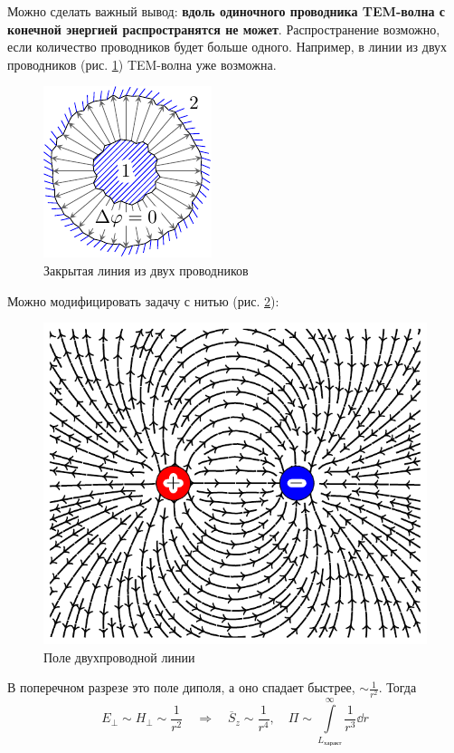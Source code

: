 Можно сделать важный вывод: \textbf{вдоль одиночного проводника TEM-волна с конечной энергией распространятся не может}. Распространение возможно, если количество проводников будет больше одного. Например, в линии из двух проводников (рис. \ref{fig:lect4:4}) TEM-волна уже возможна.

\begin{figure}[h!]
	\centering
	\includegraphics[scale=1.5]{img/lect4_ris4}
	\caption{Закрытая линия из двух проводников}
	\label{fig:lect4:4}
\end{figure}

Можно модифицировать задачу с нитью (рис. \ref{fig:lect4:5}):

\begin{figure}[h!]
	\centering
	\includegraphics[scale=0.7]{img/lect4_ris5}
	\caption{Поле двухпроводной линии}
	\label{fig:lect4:5}
\end{figure}

В поперечном разрезе это поле диполя, а оно спадает быстрее, $\sim \frac{1}{r^2}$. Тогда
\begin{equation*}
E_\perp\sim H_\perp \sim \frac{1}{r^2}
\quad \Rightarrow \quad
\overline{S}_z \sim \frac{1}{r^4}, \quad
\Pi \sim \int\limits_{L_\text{характ}}^\infty \frac{1}{r^3} \dd{r}
\end{equation*}

